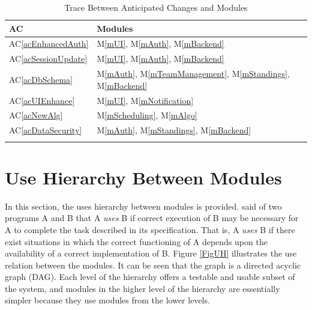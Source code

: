 \documentclass[12pt, titlepage]{article}
\newcommand{\acref}[1]{AC\ref{#1}}
\newcommand{\mref}[1]{M\ref{#1}}
\begin{document}
\begin{table}[H]
  \centering
  \begin{tabular}{p{} p{}}
    \toprule
    \textbf{AC}             & \textbf{Modules}                                                         \\
    \midrule
    \acref{acEnhancedAuth}  & \mref{mUI}, \mref{mAuth}, \mref{mBackend}                                \\
    \acref{acSessionUpdate} & \mref{mUI}, \mref{mAuth}, \mref{mBackend}                                \\
    \acref{acDbSchema}      & \mref{mAuth}, \mref{mTeamManagement}, \mref{mStandings}, \mref{mBackend} \\
    \acref{acUIEnhance}     & \mref{mUI}, \mref{mNotification}                                         \\
    \acref{acNewAlg}        & \mref{mScheduling}, \mref{mAlgo}                                         \\
    \acref{acDataSecurity}  & \mref{mAuth}, \mref{mStandings}, \mref{mBackend}                         \\                              \\
    \bottomrule
  \end{tabular}
  \caption{Trace Between Anticipated Changes and Modules}
  \label{TblACT}
\end{table}

\section{Use Hierarchy Between Modules} \label{SecUse}

In this section, the uses hierarchy between modules is
provided. \citet{Parnas1978} said of two programs A and B that A {\em uses} B if
correct execution of B may be necessary for A to complete the task described in
its specification. That is, A {\em uses} B if there exist situations in which
the correct functioning of A depends upon the availability of a correct
implementation of B.  Figure \ref{FigUH} illustrates the use relation between
the modules. It can be seen that the graph is a directed acyclic graph
(DAG). Each level of the hierarchy offers a testable and usable subset of the
system, and modules in the higher level of the hierarchy are essentially simpler
because they use modules from the lower levels.
\end{document}
